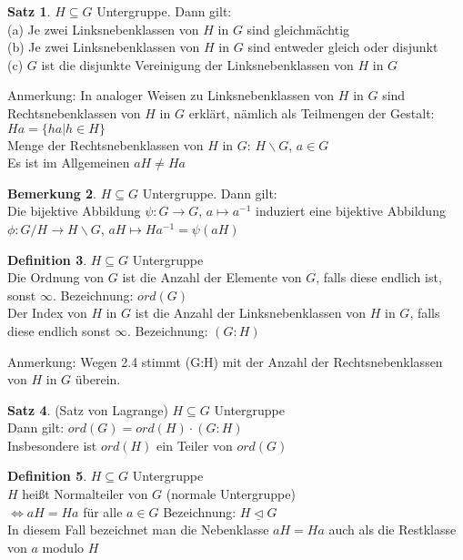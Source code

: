 \documentclass[10pt,a4paper,numbers=endperiod]{scrreprt}
\theoremstyle{definition}
\newtheorem{satz}{Satz}[section]
\newtheorem{defi}[satz]{Definition}
\newtheorem{bem}[satz]{Bemerkung}
\begin{document}
\begin{satz}
	$H \subseteq G$ Untergruppe. Dann gilt:\\
	(a) Je zwei Linksnebenklassen von $H$ in $G$ sind gleichmächtig\\
	(b) Je zwei Linksnebenklassen von $H$ in $G$ sind entweder gleich oder disjunkt\\
	(c) $G$ ist die disjunkte Vereinigung der Linksnebenklassen von $H$ in $G$
\end{satz}

Anmerkung: In analoger Weisen zu Linksnebenklassen von $H$ in $G$ sind Rechtsnebenklassen von $H$ in $G$ erklärt, nämlich als Teilmengen der Gestalt: $Ha = \{ha| h \in H\}$\\
Menge der Rechtsnebenklassen von $H$ in $G$: $H \backslash G$, $a \in G$\\
Es ist im Allgemeinen $aH \neq Ha$\\

\begin{bem}
	$H \subseteq G$ Untergruppe. Dann gilt:\\
	Die bijektive Abbildung $\psi: G \rightarrow G$, $a \mapsto a^{-1}$ induziert eine bijektive Abbildung $\phi: G/H \rightarrow H \backslash G$, $aH \mapsto Ha^{-1} = \psi(aH)$
\end{bem}

\begin{defi}
	$H \subseteq G$ Untergruppe\\
	Die Ordnung von $G$ ist die Anzahl der Elemente von $G$, falls diese endlich ist, sonst $\infty$. Bezeichnung: $ord(G)$\\
	Der Index von $H$ in $G$ ist die Anzahl der Linksnebenklassen von $H$ in $G$, falls diese endlich sonst $\infty$. Bezeichnung: $(G:H)$ 
\end{defi}

Anmerkung: Wegen 2.4 stimmt (G:H) mit der Anzahl der Rechtsnebenklassen von $H$ in $G$ überein.

\begin{satz}
	(Satz von Lagrange) 
	$H \subseteq G$ Untergruppe\\
	Dann gilt: $ord(G) = ord(H) \cdot (G:H)$\\
	Insbesondere ist $ord(H)$ ein Teiler von $ord(G)$ 
\end{satz}

\begin{defi}
	$H \subseteq G$ Untergruppe\\
	$H$ heißt Normalteiler von $G$ (normale Untergruppe)\\
	$\Leftrightarrow aH = Ha$ für alle $a \in G$ Bezeichnung: $H \underline{\vartriangleleft} G$\\
	In diesem Fall bezeichnet man die Nebenklasse $aH = Ha$ auch als die Restklasse von $a$ modulo $H$
\end{defi}
\end{document}
